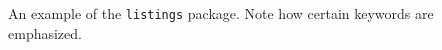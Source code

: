 \documentclass[polish]{article}
\begin{document}
\noindent
An example of the \texttt{listings} package. Note how certain
keywords are emphasized.



\noindent
\end{document}
